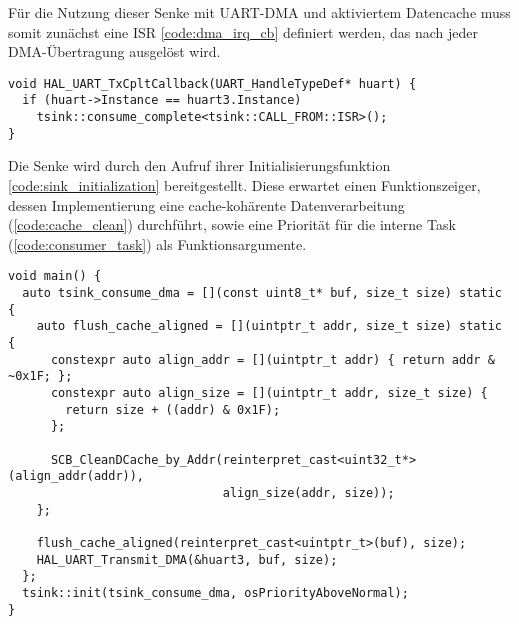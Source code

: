 Für die Nutzung dieser Senke mit UART-DMA und aktiviertem Datencache muss somit
zunächst eine ISR \ref{code:dma_irq_cb} definiert werden, das nach jeder
DMA-Übertragung ausgelöst wird.

\begin{code}
\begin{verbatim}
void HAL_UART_TxCpltCallback(UART_HandleTypeDef* huart) {
  if (huart->Instance == huart3.Instance)
    tsink::consume_complete<tsink::CALL_FROM::ISR>();
}
\end{verbatim}
    \label{code:dma_irq_cb}
\end{code}

Die Senke wird durch den Aufruf ihrer Initialisierungsfunktion
\ref{code:sink_initialization} bereitgestellt. Diese erwartet einen
Funktionszeiger, dessen Implementierung eine cache-kohärente Datenverarbeitung
(\ref{code:cache_clean}) durchführt, sowie eine Priorität für die interne Task
(\ref{code:consumer_task}) als Funktionsargumente.

\begin{code}
\begin{verbatim}
void main() {
  auto tsink_consume_dma = [](const uint8_t* buf, size_t size) static {
    auto flush_cache_aligned = [](uintptr_t addr, size_t size) static {
      constexpr auto align_addr = [](uintptr_t addr) { return addr & ~0x1F; };
      constexpr auto align_size = [](uintptr_t addr, size_t size) {
        return size + ((addr) & 0x1F);
      };

      SCB_CleanDCache_by_Addr(reinterpret_cast<uint32_t*>(align_addr(addr)),
                              align_size(addr, size));
    };

    flush_cache_aligned(reinterpret_cast<uintptr_t>(buf), size);
    HAL_UART_Transmit_DMA(&huart3, buf, size);
  };
  tsink::init(tsink_consume_dma, osPriorityAboveNormal);
}
\end{verbatim}
    \label{code:sink_initialization}
\end{code}

